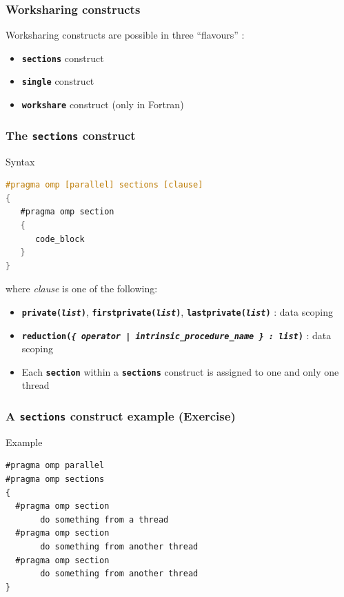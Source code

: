 \begin{frame}[containsverbatim]
\frametitle{Worksharing constructs}

\begin{block}{}
Worksharing constructs are possible in three ``flavours'' :
\begin{itemize}
\item{\textbf{\texttt{sections}} construct}
\item{\textbf{\texttt{single}} construct}
\item{\textbf{\texttt{workshare}} construct (only in Fortran)}
\end{itemize}
\end{block}

\end{frame}

\begin{frame}[containsverbatim]
\frametitle{The \texttt{sections} construct}
\begin{exampleblock}{Syntax}

\begin{lstlisting}[language=C,frame=lines]
#pragma omp [parallel] sections [clause]
{
   #pragma omp section
   {
      code_block
   }
}\end{lstlisting}
where \textit{clause} is one of the following:
\begin{itemize}
\item{\textbf{\texttt{private(\textit{list})}}, \textbf{\texttt{firstprivate(\textit{list})}}, \textbf{\texttt{lastprivate(\textit{list})}} : data scoping}
\item{\textbf{\texttt{reduction(\textit{\{ operator | intrinsic\_procedure\_name \} : list})}} : data scoping}
\item{Each \textbf{\texttt{section}} within a \textbf{\texttt{sections}} construct is assigned to one and only one thread}
\end{itemize}
\end{exampleblock}


\end{frame}


\begin{frame}[containsverbatim]
\frametitle{A \texttt{sections} construct example (Exercise)}


\begin{block}{Example}
\begin{verbatim}
#pragma omp parallel
#pragma omp sections
{
  #pragma omp section
       do something from a thread
  #pragma omp section
       do something from another thread
  #pragma omp section
       do something from another thread
}
\end{verbatim}
\end{block}

\end{frame}


